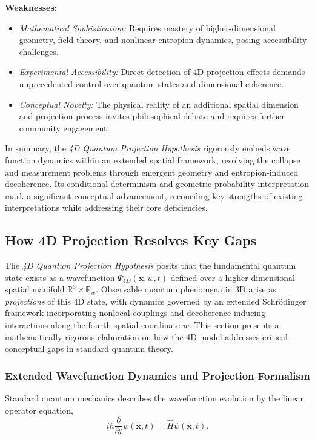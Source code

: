 \documentclass[12pt]{article}
\begin{document}
\textbf{Weaknesses:}
\begin{itemize}
    \item \emph{Mathematical Sophistication:} Requires mastery of higher-dimensional geometry, field theory, and nonlinear entropion dynamics, posing accessibility challenges.
    \item \emph{Experimental Accessibility:} Direct detection of 4D projection effects demands unprecedented control over quantum states and dimensional coherence.
    \item \emph{Conceptual Novelty:} The physical reality of an additional spatial dimension and projection process invites philosophical debate and requires further community engagement.
\end{itemize}

\vspace{0.5em}
\noindent
In summary, the \emph{4D Quantum Projection Hypothesis} rigorously embeds wave function dynamics within an extended spatial framework, resolving the collapse and measurement problems through emergent geometry and entropion-induced decoherence. Its conditional determinism and geometric probability interpretation mark a significant conceptual advancement, reconciling key strengths of existing interpretations while addressing their core deficiencies.


\subsection{How 4D Projection Resolves Key Gaps}
\label{subsec:4d_projection_resolves_gaps}
The \emph{4D Quantum Projection Hypothesis} posits that the fundamental quantum state exists as a wavefunction $\Psi_{4D}(\mathbf{x}, w, t)$ defined over a higher-dimensional spatial manifold $\mathbb{R}^3 \times \mathbb{R}_w$. Observable quantum phenomena in 3D arise as \emph{projections} of this 4D state, with dynamics governed by an extended Schrödinger framework incorporating nonlocal couplings and decoherence-inducing interactions along the fourth spatial coordinate $w$. This section presents a mathematically rigorous elaboration on how the 4D model addresses critical conceptual gaps in standard quantum theory.

\subsubsection*{Extended Wavefunction Dynamics and Projection Formalism}

Standard quantum mechanics describes the wavefunction evolution by the linear operator equation,
\begin{equation}
    i \hbar \frac{\partial}{\partial t} \psi(\mathbf{x}, t) = \hat{H} \psi(\mathbf{x}, t).
    \label{eq:standard_schrodinger}
\end{equation}
\end{document}

